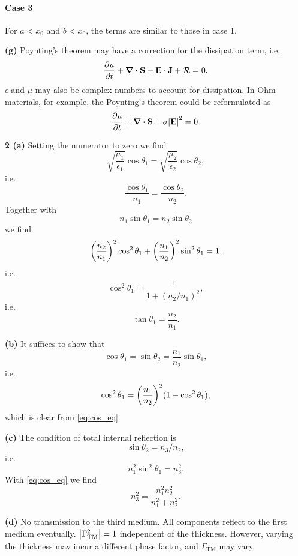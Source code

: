 \documentclass{article}
\makeatletter
\newcommand*{\shifttext}[1]{%
  \settowidth{\@tempdima}{#1}%
  \hspace{-\@tempdima}#1%
}
\newcommand{\plabel}[1]{%
\shifttext{\textbf{#1}\quad}%
}
\newcommand{\prule}{%
\begin{center}%
\hdashrule[0.5ex]{.99\linewidth}{1pt}{1pt 2.5pt}%
\end{center}%
}
\makeatother
\begin{document}
\paragraph*{Case 3} For $a<x_0$ and $b<x_0$, the terms are similar to those in case 1.

\plabel{(g)}%
Poynting's theorem may have a correction for the dissipation term, i.e.
\[ \pdv{u}{t} + \div \vb{S} + \vb{E}\cdot \vb{J} + \mathcal{R} = 0. \]
$\epsilon$ and $\mu$ may also be complex numbers to account for dissipation.
In Ohm materials, for example, the Poynting's theorem could be reformulated as
\[ \pdv{u}{t} + \div \vb{S} + \sigma\abs{\vb{E}}^2 = 0. \]

\prule

\plabel{2 (a)}%
Setting the numerator to zero we find
\[ \sqrt{\frac{\mu_1}{\epsilon_1}}\cos\theta_1 = \sqrt{\frac{\mu_2}{\epsilon_2}}\cos\theta_2, \]
i.e.
\[ \frac{\cos\theta_1}{n_1} = \frac{\cos\theta_2}{n_2}. \]
Together with
\[ n_1 \sin\theta_1 = n_2 \sin\theta_2 \]
we find
\[ \qty(\frac{n_2}{n_1})^2 \cos^2\theta_1 + \qty(\frac{n_1}{n_2})^2\sin^2\theta_1 = 1, \]
i.e.
\begin{equation}
    \label{eq:cos_eq}
    \cos^2\theta_1 = \frac{1}{1+(n_2/n_1)^2},
\end{equation}
i.e.
\[ \tan\theta_1 = \frac{n_2}{n_1}. \]

\plabel{(b)}%
It suffices to show that
\[ \cos\theta_1 = \sin\theta_2 = \frac{n_1}{n_2}\sin\theta_1, \]
i.e.
\[ \cos^2\theta_1 = \qty(\frac{n_1}{n_2})^2(1-\cos^2\theta_1), \]
which is clear from \cref{eq:cos_eq}.

\plabel{(c)}%
The condition of total internal reflection is
\[ \sin\theta_2 = n_3 / n_2, \]
i.e.
\[ n_1^2 \sin^2\theta_1 = n_3^2. \]
With \cref{eq:cos_eq} we find
\[ n_3^2 = \frac{n_1^2 n_2^2}{n_1^2 + n_2^2}. \]

\plabel{(d)}%
No transmission to the third medium.
All components reflect to the first medium eventually.
$\abs{\Gamma^2_{\mathrm{TM}}} = 1$ independent of the thickness.
However, varying the thickness may incur a different phase factor, and $\Gamma_{\mathrm{TM}}$ may vary.

% 
% 
\end{document}

